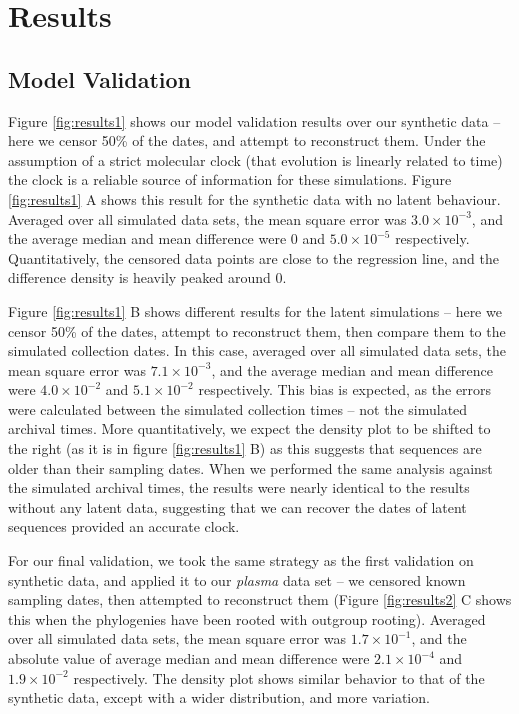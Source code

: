 \documentclass[12pt]{article}
\begin{document}
\section * {Results} \label{sec:results}



\subsection * {Model Validation} \label{sec:sim_results}



Figure \ref{fig:results1} shows our model validation results over our synthetic data -- here we censor 50\% of the dates, and attempt to reconstruct them. 
Under the assumption of a strict molecular clock (that evolution is linearly related to time) the clock is a reliable source of information for these simulations.
Figure \ref{fig:results1} A shows this result for the synthetic data with no latent behaviour.
Averaged over all simulated data sets, the mean square error was $3.0\times 10^{-3}$, and the average median and mean difference were 0 and $5.0\times 10^{-5}$ respectively. 
Quantitatively, the censored data points are close to the regression line, and the difference density is heavily peaked around 0. 

Figure \ref{fig:results1} B shows different results for the latent simulations -- here we censor 50\% of the dates, attempt to reconstruct them, then compare them to the simulated collection dates. 
In this case, averaged over all simulated data sets, the mean square error was $7.1\times 10^{-3}$, and the average median and mean difference were $4.0\times 10^{-2}$ and $5.1\times 10^{-2}$ respectively. 
This bias is expected, as the errors were calculated between the simulated collection times -- not the simulated archival times.
More quantitatively, we expect the density plot to be shifted to the right (as it is in figure \ref{fig:results1} B) as this suggests that sequences are older than their sampling dates.
When we performed the same analysis against the simulated archival times, the results were nearly identical to the results without any latent data, suggesting that we can recover the dates of latent sequences provided an accurate clock.

For our final validation, we took the same strategy as the first validation on synthetic data, and applied it to our {\em plasma} data set -- we censored known sampling dates, then attempted to reconstruct them (Figure \ref{fig:results2} C shows this when the phylogenies have been rooted with outgroup rooting). 
Averaged over all simulated data sets, the mean square error was $1.7\times 10^{-1}$, and the absolute value of average median and mean difference were $2.1\times 10^{-4}$ and $1.9\times 10^{-2}$ respectively. 
The density plot shows similar behavior to that of the synthetic data, except with a wider distribution, and more variation. 
\end{document}
